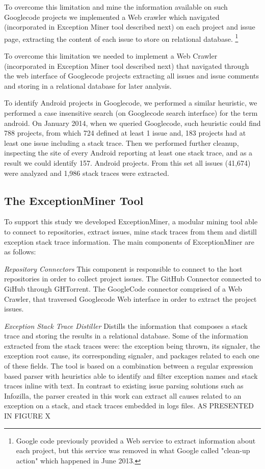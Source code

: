 \documentclass[conference]{IEEEtran}
\begin{document}
To overcome this limitation and mine the information available on such Googlecode 
projects we implemented a Web crawler which navigated (incorporated in Exception Miner tool described next) 
 on each project and issue page, extracting the content of each issue to store on relational database. \footnote{Google code previously provided a Web service to extract information about each project, but this service was removed in what Google called "clean-up action" which happened in June 2013.}

To overcome this limitation we needed to implement a Web Crawler (incorporated in Exception Miner tool described next) that navigated 
through the web interface of Googlecode projects extracting all issues and issue comments and storing in a relational database for later analysis.

To identify Android projects in Googlecode, we performed a similar heuristic, we performed a case insensitive search 
(on Googlecode search interface) for the term \textsf{android}.  On January 2014, when we queried Googlecode, such heuristic could
 find 788  projects, from which 724 defined at least 1 issue and, 183 projects 
had at least one issue including a stack trace. Then we performed further cleanup, inspecting the site of every Android
reporting at least one stack trace, and as a result we could identify 157. 
Android projects.  From this set all issues (41,674) were analyzed and 1,986 stack traces were extracted.

\subsection{The ExceptionMiner Tool}
\label{sec:exceptionminer}

To support this study we developed ExceptionMiner, a modular mining tool able 
to connect to repositories, extract issues, mine stack traces from
them and distill exception stack trace information. The main components of
ExceptionMiner are as follows:

\noindent\emph{Repository Connectors}  This component is responsible to connect to
 the host repositories in order to collect project issues. The GitHub Connector connected
 to GiHub through GHTorrent. The GoogleCode connector comprised of a Web Crawler,
 that traversed Googlecode Web interface in order to extract the project issues.

\noindent\emph{Exception Stack Trace Distiller} 
Distills the information that composes a stack trace and storing the results in a
relational database. Some of the information extracted from the stack traces were:
 the exception being thrown, its signaler, the exception root cause, its corresponding signaler,
and packages related to each one of these fields.
The tool is based on a combination between a regular expression based parser 
with heuristics able to identify and filter exception names and stack traces inline with text. In
contrast to existing issue parsing solutions such as Infozilla, the parser
created in this work can extract all causes related to an exception on a stack,
and stack traces embedded in logs files.
AS PRESENTED IN FIGURE X
\end{document}
